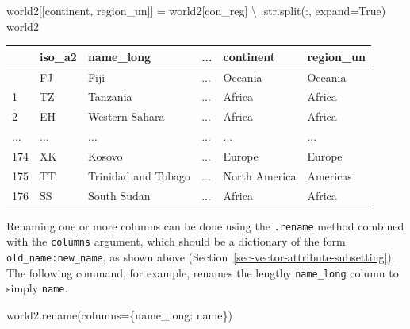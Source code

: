 \documentclass[
  letterpaper,
]{krantz}
\newenvironment{Shaded}{\begin{snugshade}}{\end{snugshade}}
\newcommand{\BuiltInTok}[1]{\textcolor[rgb]{0.00,0.23,0.31}{#1}}
\newcommand{\NormalTok}[1]{\textcolor[rgb]{0.00,0.23,0.31}{#1}}
\newcommand{\OperatorTok}[1]{\textcolor[rgb]{0.37,0.37,0.37}{#1}}
\newcommand{\StringTok}[1]{\textcolor[rgb]{0.13,0.47,0.30}{#1}}
\newcommand{\VariableTok}[1]{\textcolor[rgb]{0.07,0.07,0.07}{#1}}
\begin{document}
\begin{Shaded}
\begin{Highlighting}[]
\NormalTok{world2[[}\StringTok{\textquotesingle{}continent\textquotesingle{}}\NormalTok{, }\StringTok{\textquotesingle{}region\_un\textquotesingle{}}\NormalTok{]] }\OperatorTok{=}\NormalTok{ world2[}\StringTok{\textquotesingle{}con\_reg\textquotesingle{}}\NormalTok{] }\OperatorTok{\textbackslash{}}
\NormalTok{    .}\BuiltInTok{str}\NormalTok{.split(}\StringTok{\textquotesingle{}:\textquotesingle{}}\NormalTok{, expand}\OperatorTok{=}\VariableTok{True}\NormalTok{)}
\NormalTok{world2}
\end{Highlighting}
\end{Shaded}

\begin{longtable}[]{@{}llllll@{}}
\toprule\noalign{}
& iso\_a2 & name\_long & ... & continent & region\_un \\
\midrule\noalign{}
\endhead
\bottomrule\noalign{}
\endlastfoot
0 & FJ & Fiji & ... & Oceania & Oceania \\
1 & TZ & Tanzania & ... & Africa & Africa \\
2 & EH & Western Sahara & ... & Africa & Africa \\
... & ... & ... & ... & ... & ... \\
174 & XK & Kosovo & ... & Europe & Europe \\
175 & TT & Trinidad and Tobago & ... & North America & Americas \\
176 & SS & South Sudan & ... & Africa & Africa \\
\end{longtable}

Renaming one or more columns can be done using the \texttt{.rename}
method combined with the \texttt{columns} argument, which should be a
dictionary of the form \texttt{old\_name:new\_name}, as shown above
(Section~\ref{sec-vector-attribute-subsetting}). The following command,
for example, renames the lengthy \texttt{name\_long} column to simply
\texttt{name}.

\begin{Shaded}
\begin{Highlighting}[]
\NormalTok{world2.rename(columns}\OperatorTok{=}\NormalTok{\{}\StringTok{\textquotesingle{}name\_long\textquotesingle{}}\NormalTok{: }\StringTok{\textquotesingle{}name\textquotesingle{}}\NormalTok{\})}
\end{Highlighting}
\end{Shaded}
\end{document}
